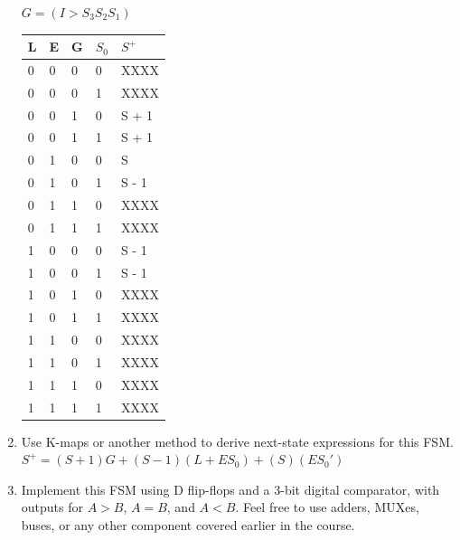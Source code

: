 \documentclass{article}
\begin{document}
\begin{enumerate}[label=\alph*.]
$G = (I > S_3S_2S_1)$ \\
\begin{table}[!h]
\begin{tabular}{|l|l|l|l|l|}
\hline
L & E & G & $S_0$ & $S^+$ \\ \hline
0 & 0 & 0 & 0    & XXXX                 \\ \hline
0 & 0 & 0 & 1    & XXXX                 \\ \hline
0 & 0 & 1 & 0    & S + 1                \\ \hline
0 & 0 & 1 & 1    & S + 1                \\ \hline
0 & 1 & 0 & 0    & S                    \\ \hline
0 & 1 & 0 & 1    & S - 1                \\ \hline
0 & 1 & 1 & 0    & XXXX                 \\ \hline
0 & 1 & 1 & 1    & XXXX                 \\ \hline
1 & 0 & 0 & 0    & S - 1                \\ \hline
1 & 0 & 0 & 1    & S - 1                \\ \hline
1 & 0 & 1 & 0    & XXXX                 \\ \hline
1 & 0 & 1 & 1    & XXXX                 \\ \hline
1 & 1 & 0 & 0    & XXXX                 \\ \hline
1 & 1 & 0 & 1    & XXXX                 \\ \hline
1 & 1 & 1 & 0    & XXXX                 \\ \hline
1 & 1 & 1 & 1    & XXXX                 \\ \hline
\end{tabular}
\end{table}
\item Use K-maps or another method to derive next-state expressions for this FSM. \\
$S^+ = (S + 1)G + (S - 1)(L + ES_0) + (S)(ES_0')$
\newpage
\item Implement this FSM using D flip-flops and a 3-bit digital comparator, with outputs for $A > B$, $A = B$, and $A < B$. Feel free to use adders, MUXes, buses, or any other component covered earlier in the course.
\begin{figure}[!h]
    \centering

\end{figure}
\end{enumerate}
\end{document}
